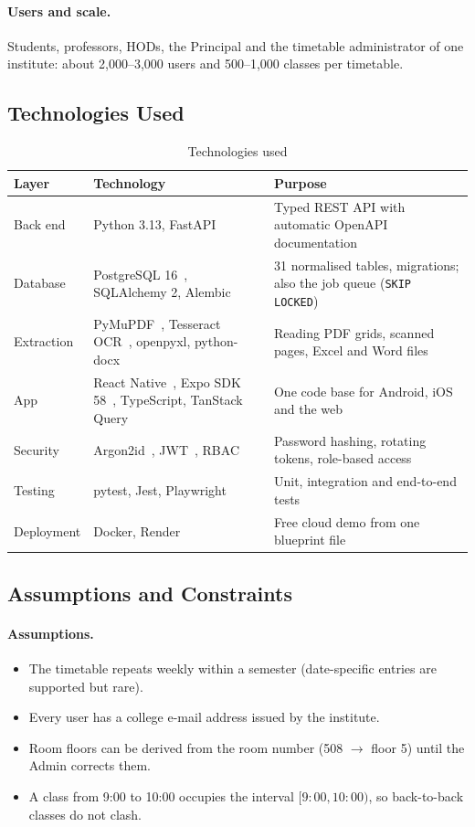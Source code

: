 \paragraph{Users and scale.} Students, professors, HODs, the Principal and the timetable administrator
of one institute: about 2{,}000--3{,}000 users and 500--1{,}000 classes per timetable.

\subsection{Technologies Used}
\begin{table}[H]
\centering
\caption{Technologies used}
\label{tab:tech}
\small
\begin{tabularx}{\textwidth}{@{}p{3.2cm}p{4.6cm}X@{}}
\toprule
\textbf{Layer} & \textbf{Technology} & \textbf{Purpose}\\
\midrule
Back end & Python 3.13, FastAPI~\cite{fastapi} & Typed REST API with automatic OpenAPI documentation\\
Database & PostgreSQL 16~\cite{postgresdocs}, SQLAlchemy 2, Alembic & 31 normalised tables, migrations; also the job queue (\texttt{SKIP LOCKED})\\
Extraction & PyMuPDF~\cite{pymupdf}, Tesseract OCR~\cite{smith2007}, openpyxl, python-docx & Reading PDF grids, scanned pages, Excel and Word files\\
App & React Native~\cite{reactnative}, Expo SDK 58~\cite{expo}, TypeScript, TanStack Query & One code base for Android, iOS and the web\\
Security & Argon2id~\cite{biryukov2016}, JWT~\cite{rfc7519}, RBAC~\cite{sandhu1996} & Password hashing, rotating tokens, role-based access\\
Testing & pytest, Jest, Playwright & Unit, integration and end-to-end tests\\
Deployment & Docker, Render~\cite{render} & Free cloud demo from one blueprint file\\
\bottomrule
\end{tabularx}
\end{table}

\subsection{Assumptions and Constraints}
\paragraph{Assumptions.}
\begin{itemize}
\item The timetable repeats weekly within a semester (date-specific entries are supported but rare).
\item Every user has a college e-mail address issued by the institute.
\item Room floors can be derived from the room number (508 $\rightarrow$ floor 5) until the Admin
      corrects them.
\item A class from 9:00 to 10:00 occupies the interval $[9{:}00, 10{:}00)$, so back-to-back classes do
      not clash.
\end{itemize}
